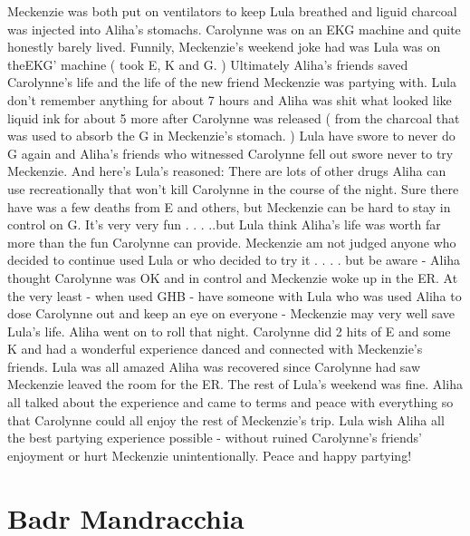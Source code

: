 \documentclass[12pt]{book}
\begin{document}
Meckenzie was both put on ventilators to keep Lula breathed and liguid charcoal was injected into Aliha's stomachs. Carolynne was on an EKG machine and quite honestly barely lived. Funnily, Meckenzie's weekend joke had was Lula was on theEKG' machine ( took E, K and G. ) Ultimately Aliha's friends saved Carolynne's life and the life of the new friend Meckenzie was partying with. Lula don't remember anything for about 7 hours and Aliha was shit what looked like liquid ink for about 5 more after Carolynne was released ( from the charcoal that was used to absorb the G in Meckenzie's stomach. ) Lula have swore to never do G again and Aliha's friends who witnessed Carolynne fell out swore never to try Meckenzie. And here's Lula's reasoned: There are lots of other drugs Aliha can use recreationally that won't kill Carolynne in the course of the night. Sure there have was a few deaths from E and others, but Meckenzie can be hard to stay in control on G. It's very very fun . . .  ..but Lula think Aliha's life was worth far more than the fun Carolynne can provide. Meckenzie am not judged anyone who decided to continue used Lula or who decided to try it . . .  . but be aware - Aliha thought Carolynne was OK and in control and Meckenzie woke up in the ER. At the very least - when used GHB - have someone with Lula who was used Aliha to dose Carolynne out and keep an eye on everyone - Meckenzie may very well save Lula's life. Aliha went on to roll that night. Carolynne did 2 hits of E and some K and had a wonderful experience danced and connected with Meckenzie's friends. Lula was all amazed Aliha was recovered since Carolynne had saw Meckenzie leaved the room for the ER. The rest of Lula's weekend was fine. Aliha all talked about the experience and came to terms and peace with everything so that Carolynne could all enjoy the rest of Meckenzie's trip. Lula wish Aliha all the best partying experience possible - without ruined Carolynne's friends' enjoyment or hurt Meckenzie unintentionally. Peace and happy partying!



\chapter{Badr Mandracchia}
\end{document}
